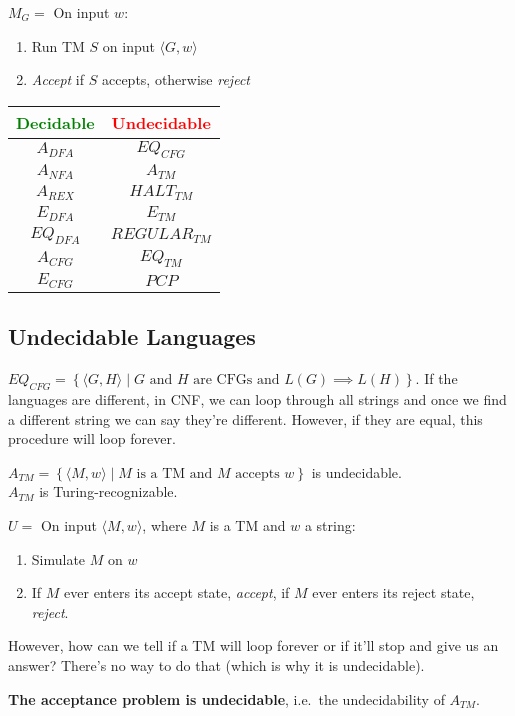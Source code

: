 \documentclass[12 pt]{article}
\begin{document}
$M_G = $ On input $w$:
\begin{enumerate}
\item Run TM $S$ on input $\langle G,w \rangle$
\item \textit{Accept} if $S$ accepts, otherwise \textit{reject}
\end{enumerate}
\begin{tabular}{c c}
  \textcolor{green}{Decidable}& \textcolor{red}{Undecidable}
  \\ \hline $A_{DFA}$ & $EQ_{CFG}$ \\
                              $A_{NFA}$&$A_{TM}$ \\
                              $A_{REX}$&$HALT_{TM}$ \\
                              $E_{DFA}$&$E_{TM}$ \\
                              $EQ_{DFA}$&$REGULAR_{TM}$ \\
                              $A_{CFG}$&$EQ_{TM}$ \\
                              $E_{CFG}$&$PCP$
\end{tabular}
\subsection{Undecidable Languages}
$EQ_{CFG} = \left\{\langle G,H \rangle \mid G \text{ and }H \text{ are
  CFGs and } L(G) \implies L(H)\right\}$. If the languages are
different, in CNF, we can loop through all strings and once we find a
different string we can say they're different. However, if they are
equal, this procedure will loop forever.

$A_{TM} = \left\{\langle M,w \rangle \mid M \text{ is a TM and }M
  \text{ accepts }w\right\}$ is undecidable.
\\ $A_{TM}$ is Turing-recognizable.

$U =$ On input $\langle M,w \rangle$, where $M$ is a TM and $w$ a
string:
\begin{enumerate}
\item Simulate $M$ on $w$
\item If $M$ ever enters its accept state, \textit{accept}, if $M$
  ever enters its reject state, \textit{reject}.
\end{enumerate}
However, how can we tell if a TM will loop forever or if it'll stop
and give us an answer? There's no way to do that (which is why it is
undecidable).

\textbf{The acceptance problem is undecidable}, i.e.\ the
undecidability of $A_{TM}$.
\end{document}
